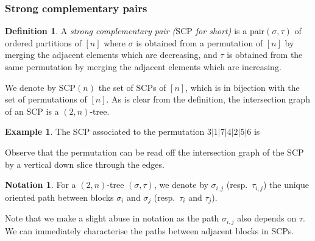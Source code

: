 \documentclass{amsart}
\newcommand{\darkblue}{\color{darkblue}} %
\theoremstyle{definition}
\newtheorem{definition}[theorem]{Definition}
\newtheorem{example}[theorem]{Example}
\newtheorem{notation}[theorem]{Notation}
\newcommand{\defn}[1]{\textsl{\darkblue #1}} %
\newcommand{\SCP}{\mathrm{SCP}}
\begin{document}

\subsubsection{Strong complementary pairs}

\begin{definition}
\label{def:strong-complementary-pairs}
A \defn{strong complementary pair ($\SCP$ for short)} is a pair$(\sigma,\tau)$ of ordered partitions of $[n]$ where $\sigma$ is obtained from a permutation of $[n]$ by merging the adjacent elements which are decreasing, and $\tau$ is obtained from the same permutation by merging the adjacent elements which are increasing.
\end{definition}

We denote by $\SCP(n)$ the set of $\SCP$s of $[n]$, which is in bijection with the set of permutations of $[n]$.
As is clear from the definition, the intersection graph of an $\SCP$ is a $(2,n)$-tree.

\begin{example}
\label{ex:strong-complementary}
The SCP associated to the permutation $3|1|7|4|2|5|6$ is
\begin{center}
\end{center}
Observe that the permutation can be read off the intersection graph of the SCP by a vertical down slice through the edges.
\end{example}

\begin{notation}
    For a $(2,n)$-tree $(\sigma,\tau)$, we denote by $\sigma_{i,j}$ (resp.~$\tau_{i,j}$) the unique oriented path between blocks $\sigma_{i}$ and $\sigma_j$ (resp.~$\tau_{i}$ and $\tau_j$).
\end{notation}
Note that we make a slight abuse in notation as the path $\sigma_{i,j}$ also depends on $\tau$.
We can immediately characterise the paths between adjacent blocks in $\SCP$s.
\end{document}
